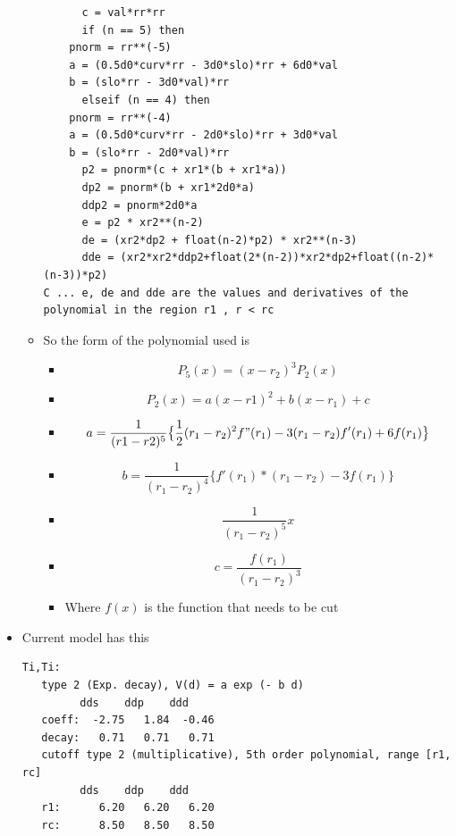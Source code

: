 \documentclass[11pt]{article}
\begin{document}
\begin{itemize}
\begin{itemize}
\begin{verbatim}
      c = val*rr*rr
      if (n == 5) then
	pnorm = rr**(-5)
	a = (0.5d0*curv*rr - 3d0*slo)*rr + 6d0*val
	b = (slo*rr - 3d0*val)*rr
      elseif (n == 4) then
	pnorm = rr**(-4)
	a = (0.5d0*curv*rr - 2d0*slo)*rr + 3d0*val
	b = (slo*rr - 2d0*val)*rr
      p2 = pnorm*(c + xr1*(b + xr1*a))
      dp2 = pnorm*(b + xr1*2d0*a)
      ddp2 = pnorm*2d0*a
      e = p2 * xr2**(n-2)
      de = (xr2*dp2 + float(n-2)*p2) * xr2**(n-3)
      dde = (xr2*xr2*ddp2+float(2*(n-2))*xr2*dp2+float((n-2)*(n-3))*p2)
C ... e, de and dde are the values and derivatives of the polynomial in the region r1 , r < rc
\end{verbatim}
\item So the form of the polynomial used is
\begin{itemize}
\item $$ P_5(x) = (x-r_2)^3 P_2(x)  $$
\item \[ P_2(x) = a(x-r1)^2 + b(x-r_1) + c \]
\item \[ a = \frac{1}{ (r1-r2)^5 } \big\{  \frac{1}{2}(r_1-r_2)^2f"(r_1) -3(r_1-r_2)f'(r_1) + 6f(r_1) \big\} \]
\item \[  b = \frac{1}{(r_1-r_2)^4} \big\{ f'(r_1)*(r_1-r_2) - 3f(r_1) \big\}  \]
\item \[ \frac{1}{(r_1 - r_2)^5} x \]
\item \[  c = \frac{ f(r_1) }{ (r_1-r_2)^3} \]
\item Where \(f(x)\) is the function that needs to be cut
\end{itemize}
\end{itemize}
\item Current model has this
\begin{verbatim}
Ti,Ti:
   type 2 (Exp. decay), V(d) = a exp (- b d)
	     dds    ddp    ddd
   coeff:  -2.75   1.84  -0.46
   decay:   0.71   0.71   0.71
   cutoff type 2 (multiplicative), 5th order polynomial, range [r1, rc]
	     dds    ddp    ddd
   r1:      6.20   6.20   6.20
   rc:      8.50   8.50   8.50

\end{verbatim}
\end{itemize}
\end{document}
